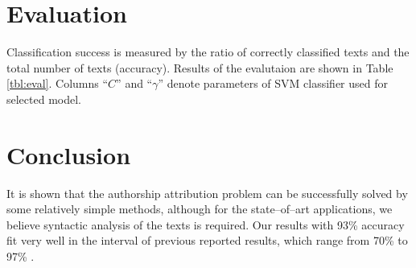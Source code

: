 \documentclass{llncs}
\begin{document}
\section{Evaluation}
\label{sec:evaluacija}
Classification success is measured by the ratio of correctly classified texts and
the total number of texts (accuracy). Results of the evalutaion are shown in Table
\ref{tbl:eval}. Columns ``$C$'' and ``$\gamma$'' denote parameters of SVM
classifier used for selected model.


% 
% 

\section{Conclusion}
It is shown that the authorship attribution problem can be successfully solved by
some relatively simple methods, although for the state--of--art applications, we
believe syntactic analysis of the texts is required. Our results with
93\% accuracy fit very well in the interval of previous reported results, which range from
70\% to 97\% \cite{coyotl2006authorship,keselj2003n,luyckx2005shallow,stamatatos2001computer}.
\end{document}
